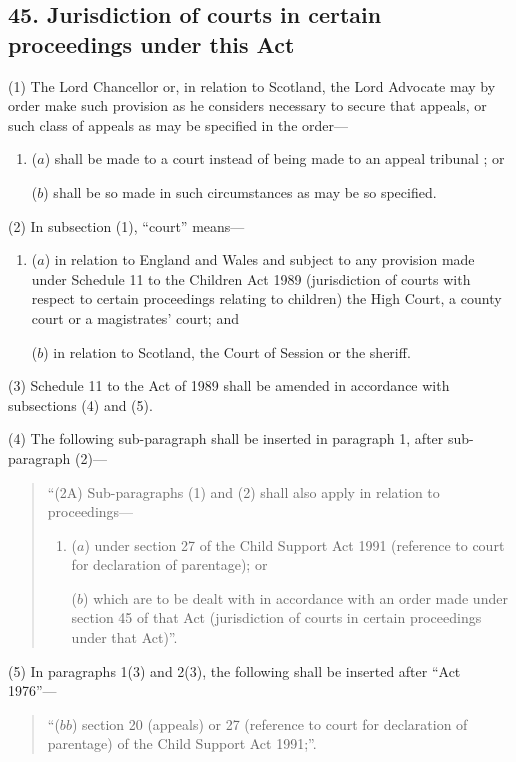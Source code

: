 \documentclass[12pt,a4paper]{article}
\begin{document}
\subsection{45. Jurisdiction of courts in certain proceedings under this Act}

(1) The Lord Chancellor or, in relation to Scotland, the Lord Advocate may by order make such provision as he considers necessary to secure that appeals, or such class of appeals as may be specified in the order—
\begin{enumerate}\item[]
($a$) shall be made to a court instead of being made to 
an appeal tribunal%
; or

($b$) shall be so made in such circumstances as may be so specified.
\end{enumerate}

(2) In subsection (1), “court” means—
\begin{enumerate}\item[]
($a$) in relation to England and Wales and subject to any provision made under Schedule 11 to the Children Act 1989 (jurisdiction of courts with respect to certain proceedings relating to children) the High Court, a county court or a magistrates' court; and

($b$) in relation to Scotland, the Court of Session or the sheriff.
\end{enumerate}

(3) Schedule 11 to the Act of 1989 shall be amended in accordance with subsections (4)  and (5).

(4) The following sub-paragraph shall be inserted in paragraph 1, after sub-paragraph (2)—
\begin{quotation}
“(2A) Sub-paragraphs (1)  and (2)  shall also apply in relation to proceedings—
\begin{enumerate}\item[]
($a$) under section 27 of the Child Support Act 1991 (reference to court for declaration of parentage); or

($b$) which are to be dealt with in accordance with an order made under section 45 of that Act (jurisdiction of courts in certain proceedings under that Act)”.
\end{enumerate}
\end{quotation}

(5) In paragraphs 1(3)  and 2(3), the following shall be inserted after “Act 1976”—
\begin{quotation}
“($bb$) section 20 (appeals) or 27 (reference to court for declaration of parentage) of the Child Support Act 1991;”.
\end{quotation}
\end{document}
